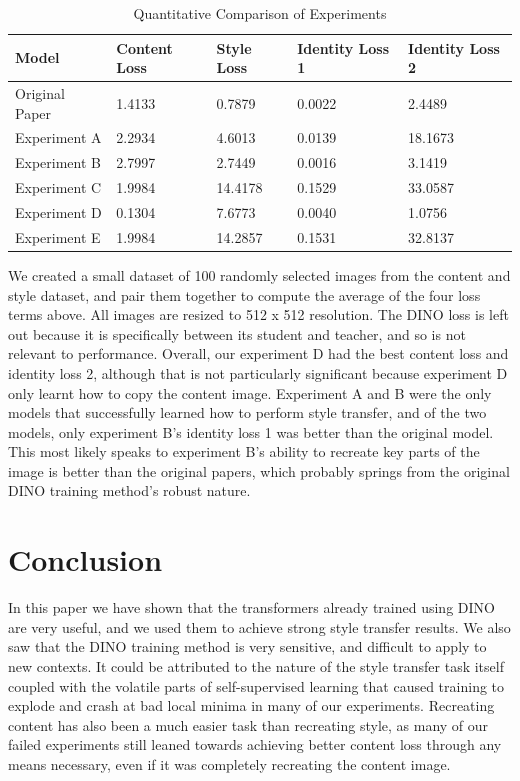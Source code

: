 \documentclass{article}
\begin{document}
\begin{table}
	\caption{Quantitative Comparison of Experiments}
	\label{quantitative}
	\centering
	\begin{tabular}{lllll}
		\toprule
		Model     &  Content Loss & Style Loss & Identity Loss 1 & Identity Loss 2 \\
		\midrule
		Original Paper & 1.4133 & 0.7879 & 0.0022 & 2.4489  \\
		Experiment A &  2.2934  & 4.6013 & 0.0139 & 18.1673  \\
		Experiment B &  2.7997 & 2.7449 & 0.0016 & 3.1419  \\
		Experiment C & 1.9984 & 14.4178 & 0.1529 & 33.0587  \\
		Experiment D & 0.1304 & 7.6773 & 0.0040 & 1.0756  \\
		Experiment E & 1.9984 & 14.2857 & 0.1531 & 32.8137  \\
		\bottomrule
	\end{tabular}
\end{table}

We created a small dataset of 100 randomly selected images from the content and style dataset, and pair them together to compute the average of the four loss terms above. All images are resized to 512 x 512 resolution. The DINO loss is left out because it is specifically between its student and teacher, and so is not relevant to performance. Overall, our experiment D had the best content loss and identity loss 2, although that is not particularly significant because experiment D only learnt how to copy the content image. Experiment A and B were the only models that successfully learned how to perform style transfer, and of the two models, only experiment B's identity loss 1 was better than the original model. This most likely speaks to experiment B's ability to recreate key parts of the image is better than the original papers, which probably springs from the original DINO training method's robust nature. 

\section{Conclusion}

In this paper we have shown that the transformers already trained using DINO are very useful, and we used them to achieve strong style transfer results. We also saw that the DINO training method is very sensitive, and difficult to apply to new contexts. It could be attributed to the nature of the style transfer task itself coupled with the volatile parts of self-supervised learning that caused training to explode and crash at bad local minima in many of our experiments. Recreating content has also been a much easier task than recreating style, as many of our failed experiments still leaned towards achieving better content loss through any means necessary, even if it was completely recreating the content image.
\end{document}
